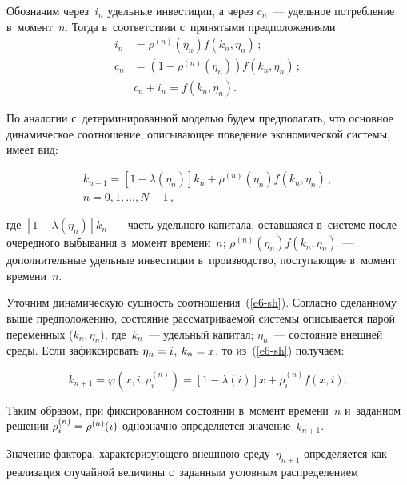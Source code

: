\begin{multicols}{2}
     Обозначим через~$i_n$ удельные инвестиции, а через $c_n$~--- удельное 
потребление в~момент~$n$. Тогда в~соответствии с~принятыми 
предположениями
     \begin{align*}
     i_n&=\rho^{(n)}\left( \eta_n\right) f(k_n, \eta_n)\,;\\
     c_n&=\left(1-\rho^{(n)}\left( \eta_n\right)\right) f(k_n,\eta_n)\,;\\
     &c_n+i_n=f(k_n,\eta_n).
     \end{align*}
     
     По аналогии с~детерминированной моделью будем предполагать, что 
основное динамическое соотношение, описывающее поведение экономической 
системы, имеет вид:

\vspace*{-6pt}

\noindent
     \begin{multline}
     k_{n+1}=\left[ 1-\lambda(\eta_n)\right] k_n+\rho^{(n)}(\eta_n) f(k_n,\eta_n)\,,\\
     n=0,1,\ldots , N-1\,,
     \label{e6-sh}
     \end{multline}
     
     \vspace*{-2pt}
     
     \noindent
где $[1-\lambda(\eta_n)]k_n$~--- часть удельного капитала, оставшаяся в~сис\-те\-ме 
после очередного выбывания в~момент времени~$n$; $\rho^{(n)}(\eta_n) 
f(k_n,\eta_n)$~--- дополнительные удельные инвестиции в~производство, 
\mbox{поступающие} в~момент времени~$n$.
     
     Уточним динамическую сущность соотношения~(\ref{e6-sh}). Со\-глас\-но 
сделанному выше предположению, со\-сто\-яние рас\-смат\-ри\-ва\-емой сис\-те\-мы 
\mbox{описывается} парой переменных ($k_n,\eta_n$), где~$k_n$~--- удельный капитал; 
$\eta_n$~--- со\-сто\-яние внеш\-ней среды. Если зафиксировать $\eta_n\hm= i$, 
$k_n\hm= x$, то из~(\ref{e6-sh}) получаем:

\noindent
     \begin{equation}
     k_{n+1}=\varphi\left( x,i,\rho_i^{(n)}\right) =[1-\lambda(i)]x+\rho_i^{(n)} f(x,i).
     \label{e7-sh}
     \end{equation}
     
     Таким образом, при фиксированном состоянии в~момент времени~$n$ 
и~заданном решении $\rho_i^{(n)}\hm= \rho^{(n)}(i)$ однозначно определяется 
значение~$k_{n+1}$.
     
     Значение фактора, характеризующего внешнюю среду~$\eta_{n+1}$ 
определяется как реализация случайной величины с~заданным условным 
распределением


\end{multicols}

